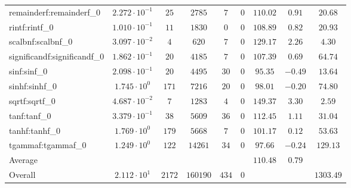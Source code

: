 \begin{tabular}{|l|c|c|c|c|c|c|c|c|}
remainderf:remainderf\_0     & $ 2.272 \cdot 10^{-1} $ & $ 25     $ & $ 2785   $ & $ 7   $ & $ 0   $ & $ 110.02      $ & $ 0.91    $ & $ 20.68   $ \\
rintf:rintf\_0               & $ 1.010 \cdot 10^{-1} $ & $ 11     $ & $ 1830   $ & $ 0   $ & $ 0   $ & $ 108.89      $ & $ 0.82    $ & $ 20.93   $ \\
scalbnf:scalbnf\_0           & $ 3.097 \cdot 10^{-2} $ & $ 4      $ & $ 620    $ & $ 7   $ & $ 0   $ & $ 129.17      $ & $ 2.26    $ & $ 4.30    $ \\
significandf:significandf\_0 & $ 1.862 \cdot 10^{-1} $ & $ 20     $ & $ 4185   $ & $ 7   $ & $ 0   $ & $ 107.39      $ & $ 0.69    $ & $ 64.74   $ \\
sinf:sinf\_0                 & $ 2.098 \cdot 10^{-1} $ & $ 20     $ & $ 4495   $ & $ 30  $ & $ 0   $ & $ 95.35       $ & $ -0.49   $ & $ 13.64   $ \\
sinhf:sinhf\_0               & $ 1.745 \cdot 10^{0}  $ & $ 171    $ & $ 7216   $ & $ 20  $ & $ 0   $ & $ 98.01       $ & $ -0.20   $ & $ 74.80   $ \\
sqrtf:sqrtf\_0               & $ 4.687 \cdot 10^{-2} $ & $ 7      $ & $ 1283   $ & $ 4   $ & $ 0   $ & $ 149.37      $ & $ 3.30    $ & $ 2.59    $ \\
tanf:tanf\_0                 & $ 3.379 \cdot 10^{-1} $ & $ 38     $ & $ 5609   $ & $ 36  $ & $ 0   $ & $ 112.45      $ & $ 1.11    $ & $ 31.04   $ \\
tanhf:tanhf\_0               & $ 1.769 \cdot 10^{0}  $ & $ 179    $ & $ 5668   $ & $ 7   $ & $ 0   $ & $ 101.17      $ & $ 0.12    $ & $ 53.63   $ \\
tgammaf:tgammaf\_0           & $ 1.249 \cdot 10^{0}  $ & $ 122    $ & $ 14261  $ & $ 34  $ & $ 0   $ & $ 97.66       $ & $ -0.24   $ & $ 129.13  $ \\
\hline
Average                      & $                     $ & $        $ & $        $ & $     $ & $     $ & $ 110.48      $ & $ 0.79    $ & $         $ \\
\hline
Overall                      & $ 2.112 \cdot 10^{1}  $ & $ 2172   $ & $ 160190 $ & $ 434 $ & $ 0   $ & $             $ & $         $ & $ 1303.49 $ \\
\hline
\end{tabular}
